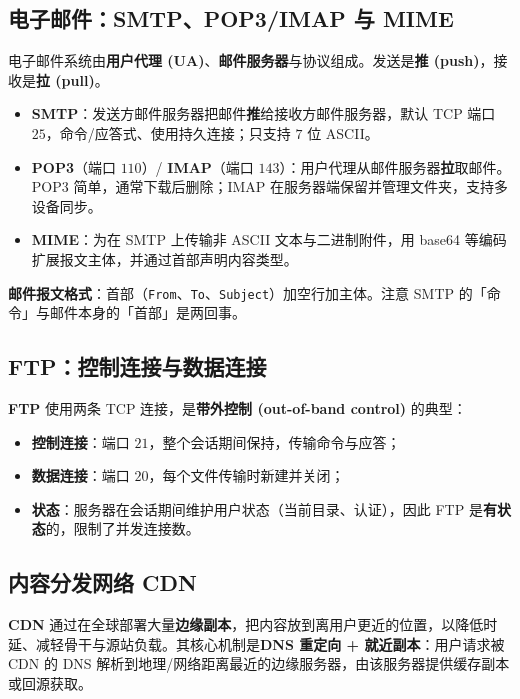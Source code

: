 \subsection{电子邮件：SMTP、POP3/IMAP 与 MIME}

电子邮件系统由\textbf{用户代理 (UA)}、\textbf{邮件服务器}与协议组成。发送是\textbf{推 (push)}，接收是\textbf{拉 (pull)}。

\begin{itemize}
    \item \textbf{SMTP}：发送方邮件服务器把邮件\textbf{推}给接收方邮件服务器，默认 TCP 端口 $25$，命令/应答式、使用持久连接；只支持 $7$ 位 ASCII。
    \item \textbf{POP3}（端口 $110$）/ \textbf{IMAP}（端口 $143$）：用户代理从邮件服务器\textbf{拉}取邮件。POP3 简单，通常下载后删除；IMAP 在服务器端保留并管理文件夹，支持多设备同步。
    \item \textbf{MIME}：为在 SMTP 上传输非 ASCII 文本与二进制附件，用 base64 等编码扩展报文主体，并通过首部声明内容类型。
\end{itemize}

\noindent\textbf{邮件报文格式}：首部（\texttt{From}、\texttt{To}、\texttt{Subject}）加空行加主体。注意 SMTP 的「命令」与邮件本身的「首部」是两回事。

\subsection{FTP：控制连接与数据连接}

\textbf{FTP} 使用两条 TCP 连接，是\textbf{带外控制 (out-of-band control)} 的典型：

\begin{itemize}
    \item \textbf{控制连接}：端口 $21$，整个会话期间保持，传输命令与应答；
    \item \textbf{数据连接}：端口 $20$，每个文件传输时新建并关闭；
    \item \textbf{状态}：服务器在会话期间维护用户状态（当前目录、认证），因此 FTP 是\textbf{有状态}的，限制了并发连接数。
\end{itemize}

\subsection{内容分发网络 CDN}

\textbf{CDN} 通过在全球部署大量\textbf{边缘副本}，把内容放到离用户更近的位置，以降低时延、减轻骨干与源站负载。其核心机制是\textbf{DNS 重定向 + 就近副本}：用户请求被 CDN 的 DNS 解析到地理/网络距离最近的边缘服务器，由该服务器提供缓存副本或回源获取。

